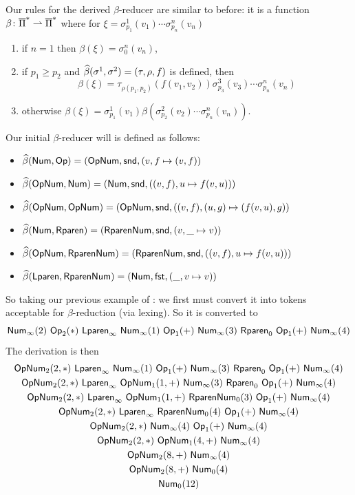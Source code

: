 \documentclass{llncs}
\begin{document}
Our rules for the derived $\beta$-reducer are similar to before: it is a function $\beta\colon\overline\Pi^* \rightharpoonup \overline\Pi^*$ where for $\xi=\sigma^1_{p_1}(v_1)\cdots\sigma^n_{p_n}(v_n)$
\begin{enumerate}
    \item if $n=1$ then $\beta(\xi)=\sigma^n_0(v_n)$,
    \item if $p_1\geq p_2$ and $\widehat\beta(\sigma^1,\sigma^2)=(\tau,\rho,f)$ is defined, then
    \[ \beta(\xi)=\tau_{\rho(p_1,p_2)}(f(v_1,v_2))\sigma^3_{p_3}(v_3)\cdots\sigma^n_{p_n}(v_n) \]
    \item otherwise $\beta(\xi)=\sigma^1_{p_1}(v_1)\beta(\sigma^2_{p_2}(v_2)\cdots\sigma^n_{p_n}(v_n))$.
\end{enumerate}

Our initial $\beta$-reducer will is defined as follows:
\begin{itemize}
    \item $\widehat\beta(\mathsf{Num},\mathsf{Op})=(\mathsf{Op}\mathsf{Num},\mathsf{snd},(v,f\mapsto(v,f))$
    \item $\widehat\beta(\mathsf{Op}\mathsf{Num},\mathsf{Num})=(\mathsf{Num},\mathsf{snd},((v,f),u\mapsto f(v,u)))$
    \item $\widehat\beta(\mathsf{Op}\mathsf{Num},\mathsf{Op}\mathsf{Num})=(\mathsf{Op}\mathsf{Num},\mathsf{snd},((v,f),(u,g)\mapsto (f(v,u),g))$
    \item $\widehat\beta(\mathsf{Num},\mathsf{Rparen})=(\mathsf{Rparen}\mathsf{Num},\mathsf{snd},(v,\_\mapsto v))$
    \item $\widehat\beta(\mathsf{Op}\mathsf{Num},\mathsf{Rparen}\mathsf{Num})=(\mathsf{Rparen}\mathsf{Num},\mathsf{snd},((v,f),u\mapsto f(v,u)))$
    \item $\widehat\beta(\mathsf{Lparen},\mathsf{Rparen}\mathsf{Num})=(\mathsf{Num},\mathsf{fst},(\_,v\mapsto v))$
\end{itemize}

So taking our previous example of : we first must convert it into tokens acceptable for $\beta$-reduction (via lexing).
So it is converted to
\[ \NUM_\infty(2)\ \OP_2(*)\ \LPAREN_\infty\ \NUM_\infty(1)\ \OP_1(+)\ \NUM_\infty(3)\ \RPAREN_0\ \OP_1(+)\ \NUM_\infty(4) \]
The derivation is then
\begin{gather*}
    \OP\NUM_2(2,*)\ \LPAREN_\infty\ \NUM_\infty(1)\ \OP_1(+)\ \NUM_\infty(3)\ \RPAREN_0\ \OP_1(+)\ \NUM_\infty(4) \\
    \OP\NUM_2(2,*)\ \LPAREN_\infty\ \OP\NUM_1(1,+)\ \NUM_\infty(3)\ \RPAREN_0\ \OP_1(+)\ \NUM_\infty(4) \\
    \OP\NUM_2(2,*)\ \LPAREN_\infty\ \OP\NUM_1(1,+)\ \RPAREN\NUM_0(3)\ \OP_1(+)\ \NUM_\infty(4) \\
    \OP\NUM_2(2,*)\ \LPAREN_\infty\ \RPAREN\NUM_0(4)\ \OP_1(+)\ \NUM_\infty(4) \\
    \OP\NUM_2(2,*)\ \NUM_\infty(4)\ \OP_1(+)\ \NUM_\infty(4) \\
    \OP\NUM_2(2,*)\ \OP\NUM_1(4,+)\ \NUM_\infty(4) \\
    \OP\NUM_2(8,+)\ \NUM_\infty(4) \\
    \OP\NUM_2(8,+)\ \NUM_0(4) \\
    \NUM_0(12)
\end{gather*}
\end{document}
